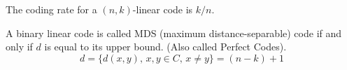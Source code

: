 \documentclass[../../main.tex]{subfiles}
\begin{document}
\begin{definition}
    The coding rate for a $(n,k)$-linear code is $k/n$.
\end{definition}


\begin{definition}
    A binary linear code is called MDS (maximum distance-separable) code if and only if $d$ is equal to its upper bound. (Also called Perfect Codes).
    \[
    d = \{d(x,y),\,x,y\in C,\, x\neq y\} = (n-k) + 1
    \]
\end{definition}
\end{document}
